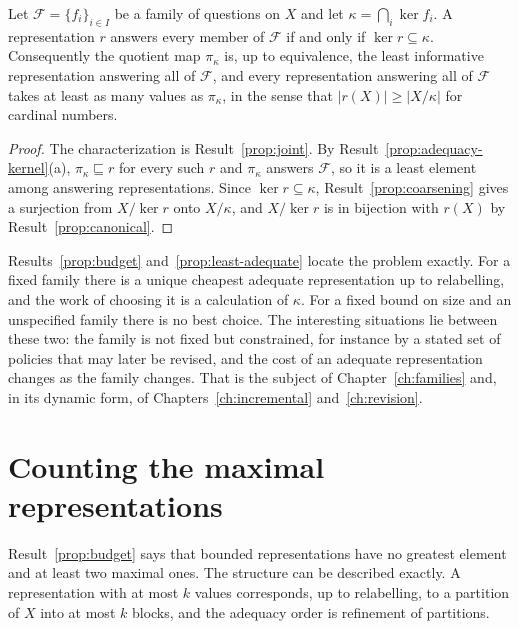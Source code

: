 \begin{established}\label{prop:least-adequate}
Let $\mathcal F=\{f_i\}_{i\in I}$ be a family of questions on $X$ and let $\kappa=\bigcap_i\ker f_i$. A representation $r$ answers every member of $\mathcal F$ if and only if $\ker r\subseteq\kappa$. Consequently the quotient map $\pi_\kappa$ is, up to equivalence, the least informative representation answering all of $\mathcal F$, and every representation answering all of $\mathcal F$ takes at least as many values as $\pi_\kappa$, in the sense that $|r(X)|\ge|X/\kappa|$ for cardinal numbers.
\end{established}
\begin{proof}
The characterization is Result~\ref{prop:joint}. By Result~\ref{prop:adequacy-kernel}(a), $\pi_\kappa\sqsubseteq r$ for every such $r$ and $\pi_\kappa$ answers $\mathcal F$, so it is a least element among answering representations. Since $\ker r\subseteq\kappa$, Result~\ref{prop:coarsening} gives a surjection from $X/{\ker r}$ onto $X/\kappa$, and $X/{\ker r}$ is in bijection with $r(X)$ by Result~\ref{prop:canonical}.
\end{proof}

\begin{remark}
Results~\ref{prop:budget} and~\ref{prop:least-adequate} locate the problem exactly. For a fixed family there is a unique cheapest adequate representation up to relabelling, and the work of choosing it is a calculation of $\kappa$. For a fixed bound on size and an unspecified family there is no best choice. The interesting situations lie between these two: the family is not fixed but constrained, for instance by a stated set of policies that may later be revised, and the cost of an adequate representation changes as the family changes. That is the subject of Chapter~\ref{ch:families} and, in its dynamic form, of Chapters~\ref{ch:incremental} and~\ref{ch:revision}.
\end{remark}


\section{Counting the maximal representations}\label{sec:maximal}

Result~\ref{prop:budget} says that bounded representations have no greatest element and at least two maximal ones. The structure can be described exactly. A representation with at most $k$ values corresponds, up to relabelling, to a partition of $X$ into at most $k$ blocks, and the adequacy order is refinement of partitions.

